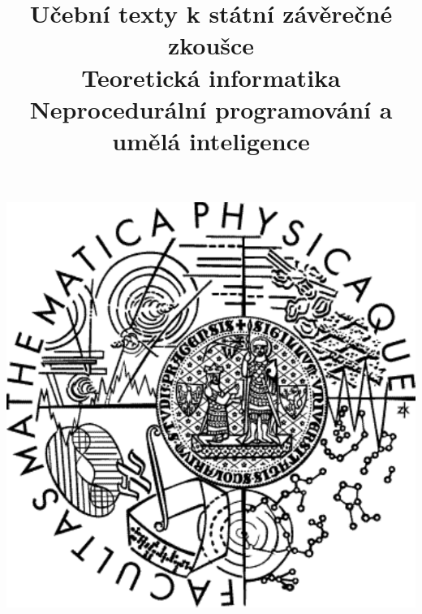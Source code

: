 \clearpage

\clearpage

\title{\LARGE Učební texty k státní závěrečné zkoušce \\ Teoretická informatika \\ Neprocedurální programování a umělá inteligence}




\maketitle

\vspace{10mm}
\begin{center}
\includegraphics[scale=0.5]{../common/logo.pdf}
\end{center} 

\clearpage

\clearpage

\tableofcontents










